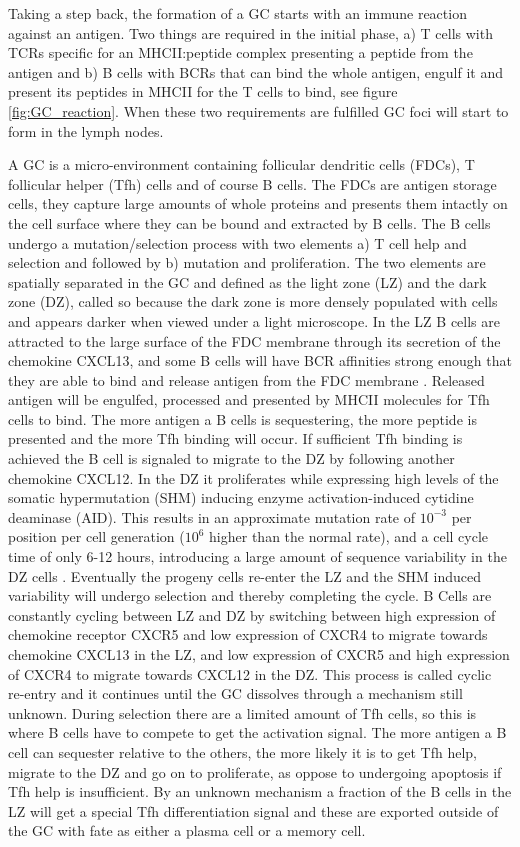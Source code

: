 Taking a step back, the formation of a GC starts with an immune reaction against an antigen.
Two things are required in the initial phase, a) T cells with TCRs specific for an MHCII:peptide complex presenting a peptide from the antigen and b) B cells with BCRs that can bind the whole antigen, engulf it and present its peptides in MHCII for the T cells to bind, see figure \ref{fig:GC_reaction}.
When these two requirements are fulfilled GC foci will start to form in the lymph nodes.

A GC is a micro-environment containing follicular dendritic cells (FDCs), T follicular helper (Tfh) cells and of course B cells.
The FDCs are antigen storage cells, they capture large amounts of whole proteins and presents them intactly on the cell surface where they can be bound and extracted by B cells.
The B cells undergo a mutation/selection process with two elements a) T cell help and selection and followed by b) mutation and proliferation.
The two elements are spatially separated in the GC and defined as the light zone (LZ) and the dark zone (DZ), called so because the dark zone is more densely populated with cells and appears darker when viewed under a light microscope.
In the LZ B cells are attracted to the large surface of the FDC membrane through its secretion of the chemokine CXCL13, and some B cells will have BCR affinities strong enough that they are able to bind and release antigen from the FDC membrane \cite{suzuki2009visualizing}.
Released antigen will be engulfed, processed and presented by MHCII molecules for Tfh cells to bind.
The more antigen a B cells is sequestering, the more peptide is presented and the more Tfh binding will occur.
If sufficient Tfh binding is achieved the B cell is signaled to migrate to the DZ by following another chemokine CXCL12.
In the DZ it proliferates while expressing high levels of the somatic hypermutation (SHM) inducing enzyme activation-induced cytidine deaminase (AID).
This results in an approximate mutation rate of $10^{-3}$ per position per cell generation ($10^{6}$ higher than the normal rate), and a cell cycle time of only 6-12 hours, introducing a large amount of sequence variability in the DZ cells \cite{victora2012germinal}.
Eventually the progeny cells re-enter the LZ and the SHM induced variability will undergo selection and thereby completing the cycle.
B Cells are constantly cycling between LZ and DZ by switching between high expression of chemokine receptor CXCR5 and low expression of CXCR4 to migrate towards chemokine CXCL13 in the LZ, and low expression of CXCR5 and high expression of CXCR4 to migrate towards CXCL12 in the DZ.
This process is called cyclic re-entry and it continues until the GC dissolves through a mechanism still unknown.
During selection there are a limited amount of Tfh cells, so this is where B cells have to compete to get the activation signal.
The more antigen a B cell can sequester relative to the others, the more likely it is to get Tfh help, migrate to the DZ and go on to proliferate, as oppose to undergoing apoptosis if Tfh help is insufficient.
By an unknown mechanism a fraction of the B cells in the LZ will get a special Tfh differentiation signal and these are exported outside of the GC with fate as either a plasma cell or a memory cell.

